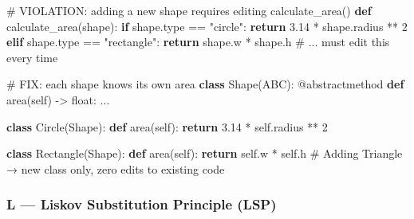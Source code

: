 \documentclass[11pt]{article}
\newenvironment{Shaded}{\begin{snugshade}}{\end{snugshade}}
\newcommand{\AttributeTok}[1]{\textcolor[rgb]{0.16,0.50,0.73}{#1}}
\newcommand{\BuiltInTok}[1]{\textcolor[rgb]{0.50,0.55,0.55}{#1}}
\newcommand{\CommentTok}[1]{\textcolor[rgb]{0.48,0.49,0.49}{#1}}
\newcommand{\ControlFlowTok}[1]{\textcolor[rgb]{0.99,0.74,0.29}{\textbf{#1}}}
\newcommand{\DecValTok}[1]{\textcolor[rgb]{0.96,0.45,0.00}{#1}}
\newcommand{\FloatTok}[1]{\textcolor[rgb]{0.96,0.45,0.00}{#1}}
\newcommand{\KeywordTok}[1]{\textcolor[rgb]{0.81,0.81,0.76}{\textbf{#1}}}
\newcommand{\NormalTok}[1]{\textcolor[rgb]{0.81,0.81,0.76}{#1}}
\newcommand{\OperatorTok}[1]{\textcolor[rgb]{0.81,0.81,0.76}{#1}}
\newcommand{\StringTok}[1]{\textcolor[rgb]{0.96,0.31,0.31}{#1}}
\newcommand{\VariableTok}[1]{\textcolor[rgb]{0.15,0.68,0.68}{#1}}
\begin{document}
\begin{Shaded}
\begin{Highlighting}[]
\CommentTok{\# VIOLATION: adding a new shape requires editing calculate\_area()}
\KeywordTok{def}\NormalTok{ calculate\_area(shape):}
    \ControlFlowTok{if}\NormalTok{ shape.}\BuiltInTok{type} \OperatorTok{==} \StringTok{"circle"}\NormalTok{:}
        \ControlFlowTok{return} \FloatTok{3.14} \OperatorTok{*}\NormalTok{ shape.radius }\OperatorTok{**} \DecValTok{2}
    \ControlFlowTok{elif}\NormalTok{ shape.}\BuiltInTok{type} \OperatorTok{==} \StringTok{"rectangle"}\NormalTok{:}
        \ControlFlowTok{return}\NormalTok{ shape.w }\OperatorTok{*}\NormalTok{ shape.h}
    \CommentTok{\# ... must edit this every time}

\CommentTok{\# FIX: each shape knows its own area}
\KeywordTok{class}\NormalTok{ Shape(ABC):}
    \AttributeTok{@abstractmethod}
    \KeywordTok{def}\NormalTok{ area(}\VariableTok{self}\NormalTok{) }\OperatorTok{{-}\textgreater{}} \BuiltInTok{float}\NormalTok{: ...}

\KeywordTok{class}\NormalTok{ Circle(Shape):}
    \KeywordTok{def}\NormalTok{ area(}\VariableTok{self}\NormalTok{): }\ControlFlowTok{return} \FloatTok{3.14} \OperatorTok{*} \VariableTok{self}\NormalTok{.radius }\OperatorTok{**} \DecValTok{2}

\KeywordTok{class}\NormalTok{ Rectangle(Shape):}
    \KeywordTok{def}\NormalTok{ area(}\VariableTok{self}\NormalTok{): }\ControlFlowTok{return} \VariableTok{self}\NormalTok{.w }\OperatorTok{*} \VariableTok{self}\NormalTok{.h}
\CommentTok{\# Adding Triangle → new class only, zero edits to existing code}
\end{Highlighting}
\end{Shaded}

\subsubsection{L --- Liskov Substitution Principle (LSP)}\label{l--liskov-substitution-principle-lsp}

\end{document}
